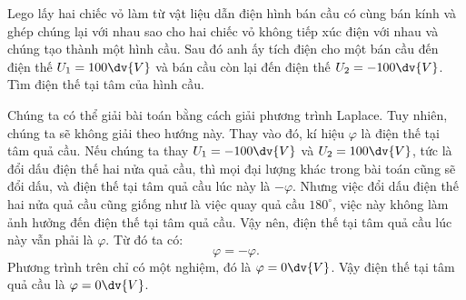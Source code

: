 \begin{vd}
   Lego lấy hai chiếc vỏ làm từ vật liệu dẫn điện hình bán cầu có cùng bán kính và ghép chúng lại với nhau sao cho hai chiếc vỏ không tiếp xúc điện với nhau và chúng tạo thành một hình cầu. Sau đó anh ấy tích điện cho một bán cầu đến điện thế $U_1=100\dv{V}$ và bán cầu còn lại đến điện thế $U_2=-100\dv{V}$. Tìm điện thế tại tâm của hình cầu. 
    \end{vd}
    \begin{loigiai}
       Chúng ta có thể giải bài toán bằng cách giải phương trình Laplace. Tuy nhiên, chúng ta sẽ không giải theo hướng này. Thay vào đó, kí hiệu $\varphi$ là điện thế tại tâm quả cầu. Nếu chúng ta thay $U_1=-100\dv{V}$ và $U_2=100\dv{V}$, tức là đổi dấu điện thế hai nửa quả cầu, thì mọi đại lượng khác trong bài toán cũng sẽ đổi dấu, và điện thế tại tâm quả cầu lúc này là $-\varphi$. Nhưng việc đổi dấu điện thế hai nửa quả cầu cũng giống như là việc quay quả cầu $180^\circ$, việc này không làm ảnh hưởng đến điện thế tại tâm quả cầu. Vậy nên, điện thế tại tâm quả cầu lúc này vẫn phải là $\varphi$. Từ đó ta có:
        \[\varphi=-\varphi.\]
        Phương trình trên chỉ có một nghiệm, đó là $\varphi=0\dv{V}$. Vậy điện thế tại tâm quả cầu là $\varphi=0\dv{V}$.
    \end{loigiai}
    
